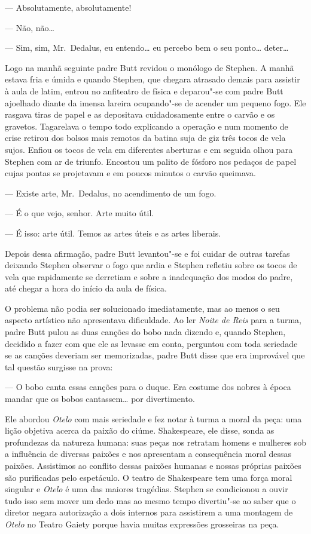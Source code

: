 --- Absolutamente, absolutamente!

--- Não, não\ldots{}

--- Sim, sim, Mr.~Dedalus, eu entendo\ldots{} eu percebo bem o seu
ponto\ldots{} deter\ldots{}

Logo na manhã seguinte padre Butt revidou o monólogo de Stephen.  A
manhã estava fria e úmida e quando Stephen, que chegara atrasado demais
para assistir à aula de latim, entrou no anfiteatro de física e
deparou"-se com padre Butt ajoelhado diante da imensa lareira
ocupando"-se de acender um pequeno fogo.  Ele rasgava tiras de papel e
as depositava cuidadosamente entre o carvão e os gravetos.  Tagarelava
o tempo todo explicando a operação e num momento de crise retirou dos
bolsos mais remotos da batina suja de giz três tocos de vela sujos.
Enfiou os tocos de vela em diferentes aberturas e em seguida olhou para
Stephen com ar de triunfo.  Encostou um palito de fósforo nos pedaços
de papel cujas pontas se projetavam e em poucos minutos o carvão
queimava.

--- Existe arte, Mr.~Dedalus, no acendimento de um fogo.

--- É o que vejo, senhor.  Arte muito útil.

--- É isso: arte útil.  Temos as artes úteis e as artes liberais.

Depois dessa afirmação, padre Butt levantou"-se e foi cuidar de outras
tarefas deixando Stephen observar o fogo que ardia e Stephen refletiu
sobre os tocos de vela que rapidamente se derretiam e sobre a
inadequação dos modos do padre, até chegar a hora do início da aula de
física.

O problema não podia ser solucionado imediatamente, mas ao menos o
seu aspecto artístico não apresentava dificuldade.  Ao ler
\textit{Noite de Reis} para a turma, padre Butt pulou as duas canções do
bobo nada dizendo e, quando Stephen, decidido a fazer com que ele as
levasse em conta, perguntou com toda seriedade se as canções deveriam
ser memorizadas, padre Butt disse que era improvável que tal questão
surgisse na prova:

--- O bobo canta essas canções para o duque.  Era costume dos
nobres à época mandar que os bobos cantassem\ldots{} por divertimento.

Ele abordou \textit{Otelo} com mais seriedade e fez notar à turma a
moral da peça: uma lição objetiva acerca da paixão do ciúme.
Shakespeare, ele disse, sonda as profundezas da natureza humana: suas
peças nos retratam homens e mulheres sob a influência de diversas
paixões e nos apresentam a consequência moral dessas paixões.
Assistimos ao conflito dessas paixões humanas e nossas próprias paixões
são purificadas pelo espetáculo.  O teatro de Shakespeare tem uma força
moral singular e \textit{Otelo} é uma das maiores tragédias.  Stephen
se condicionou a ouvir tudo isso sem mover um dedo mas ao mesmo tempo
divertiu"-se ao saber que o diretor negara autorização a dois internos
para assistirem \label{a"-uma} a uma montagem de \textit{Otelo} no Teatro Gaiety
porque havia muitas expressões grosseiras na peça.


